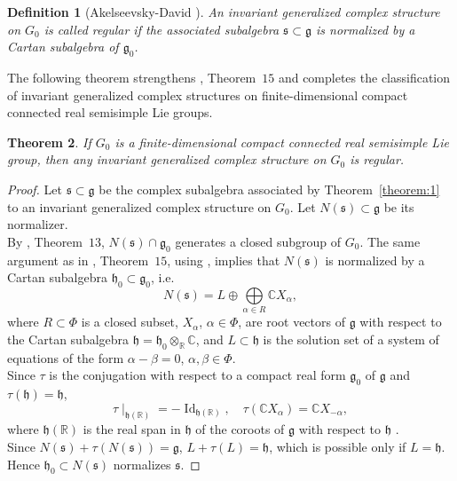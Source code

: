 \documentclass[10pt]{article}
\newtheorem{theorem}{Theorem}[section]
\newtheorem{definition}[theorem]{Definition}
\begin{document}
\begin{definition}[Akelseevsky-David \cite{Liana}]
An invariant generalized complex structure on $G_0$ is called \textit{regular} if the associated subalgebra $\mathfrak{s}\subset \mathfrak{g}$ is normalized by a Cartan subalgebra of $\mathfrak{g}_0$.
\end{definition}

The following theorem strengthens \cite{Liana}, Theorem~$15$ and completes the classification of invariant generalized complex structures on finite-dimensional compact connected real semisimple Lie groups.

\begin{theorem}\label{theorem:main}
If $G_0$ is a finite-dimensional compact connected real semisimple Lie group, then any invariant generalized complex structure on $G_0$ is regular.
\end{theorem}

\begin{proof}
Let $\mathfrak{s}\subset \mathfrak{g}$ be the complex subalgebra associated by Theorem~\ref{theorem:1} to an invariant generalized complex structure on $G_0$. Let $N (\mathfrak{s})\subset \mathfrak{g}$ be its normalizer.\\

By \cite{MalcevLarge}, Theorem~$13$, $N (\mathfrak{s})\cap \mathfrak{g}_0$ generates a closed subgroup of $G_0$. The same argument as in \cite{Liana}, Theorem~$15$, using \cite{Wang}, implies that $N (\mathfrak{s})$ is normalized by a Cartan subalgebra $\mathfrak{h}_0\subset \mathfrak{g}_0$, i.e. 
$$
N (\mathfrak{s}) = L\oplus \bigoplus\limits_{\alpha \in R}\mathbb C X_{\alpha},
$$
where $R\subset \Phi$ is a closed subset, $X_{\alpha}$, $\alpha \in \Phi$, are root vectors of $\mathfrak{g}$ with respect to the Cartan subalgebra $\mathfrak{h}=\mathfrak{h}_0 \otimes_{\mathbb R} \mathbb C$, and $L\subset \mathfrak{h}$ is the solution set of a system of equations of the form $\alpha -\beta =0$, $\alpha , \beta \in \Phi$.\\

Since $\tau$ is the conjugation with respect to a compact real form $\mathfrak{g}_0$ of $\mathfrak{g}$ and $\tau (\mathfrak{h})=\mathfrak{h}$,
$$
\tau \mid _{\mathfrak{h}(\mathbb R)}=-\operatorname{Id}_{\mathfrak{h}(\mathbb R)},\quad \tau (\mathbb C X_{\alpha})=\mathbb C X_{-\alpha},
$$
where $\mathfrak{h}(\mathbb R)$ is the real span in $\mathfrak{h}$ of the coroots of $\mathfrak{g}$ with respect to $\mathfrak{h}$ \cite{Helgason}.\\

Since $N (\mathfrak{s}) +\tau (N (\mathfrak{s}))=\mathfrak{g}$, $L +\tau (L)=\mathfrak{h}$, which is possible only if $L=\mathfrak{h}$. Hence $\mathfrak{h}_0\subset N(\mathfrak{s})$ normalizes $\mathfrak{s}$.

\end{proof}
\end{document}
